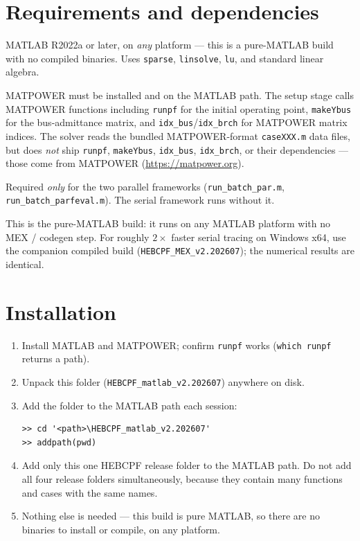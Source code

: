 \documentclass[11pt,a4paper]{article}
\newcommand{\code}[1]{\texttt{#1}}
\begin{document}
\section{Requirements and dependencies}

\begin{description}[leftmargin=0em,style=nextline]
\item[MATLAB (required).] MATLAB R2022a or later, on \emph{any} platform --- this is a
      pure-MATLAB build with no compiled binaries. Uses \code{sparse}, \code{linsolve},
      \code{lu}, and standard linear algebra.
\item[MATPOWER (required).] MATPOWER must be installed and on the MATLAB path. The setup
      stage calls MATPOWER functions including \code{runpf} for the initial operating
      point, \code{makeYbus} for the bus-admittance matrix, and
      \code{idx_bus}/\code{idx_brch} for MATPOWER matrix indices. The solver reads the
      bundled MATPOWER-format \code{caseXXX.m} data files, but does \emph{not} ship
      \code{runpf}, \code{makeYbus}, \code{idx_bus}, \code{idx_brch}, or their
      dependencies --- those come from MATPOWER (\url{https://matpower.org}).
\item[Parallel Computing Toolbox (optional).] Required \emph{only} for the two parallel
      frameworks (\code{run_batch_par.m}, \code{run_batch_parfeval.m}). The serial
      framework runs without it.
\item[No compiler needed.] This is the pure-MATLAB build: it runs on any MATLAB platform
      with no MEX / codegen step. For roughly $2\times$ faster serial tracing on Windows
      x64, use the companion compiled build (\code{HEBCPF_MEX_v2.202607}); the numerical
      results are identical.
\end{description}

\section{Installation}

\begin{enumerate}[leftmargin=1.6em]
  \item Install MATLAB and MATPOWER; confirm \code{runpf} works
        (\code{which runpf} returns a path).
  \item Unpack this folder (\code{HEBCPF_matlab_v2.202607}) anywhere on disk.
  \item Add the folder to the MATLAB path each session:
\begin{lstlisting}
>> cd '<path>\HEBCPF_matlab_v2.202607'
>> addpath(pwd)
\end{lstlisting}
  \item Add only this one HEBCPF release folder to the MATLAB path. Do not add all four
        release folders simultaneously, because they contain many functions and cases with
        the same names.
  \item Nothing else is needed --- this build is pure MATLAB, so there are no binaries to
        install or compile, on any platform.
\end{enumerate}
\end{document}
